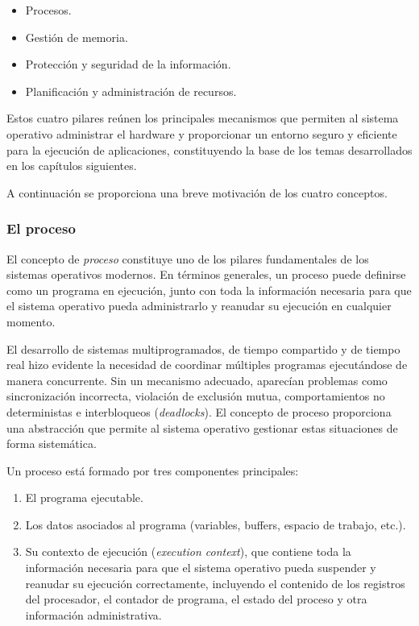 \begin{itemize}
  \item Procesos.
  \item Gestión de memoria.
  \item Protección y seguridad de la información.
  \item Planificación y administración de recursos.
\end{itemize}

Estos cuatro pilares reúnen los principales mecanismos que permiten al sistema operativo administrar el hardware y proporcionar un entorno seguro y eficiente para la ejecución de aplicaciones, constituyendo la base de los temas desarrollados en los capítulos siguientes.

A continuación se proporciona una breve motivación de los cuatro conceptos.

\subsubsection{El proceso}

El concepto de \textit{proceso} constituye uno de los pilares fundamentales de los sistemas operativos modernos. En términos generales, un proceso puede definirse como un programa en ejecución, junto con toda la información necesaria para que el sistema operativo pueda administrarlo y reanudar su ejecución en cualquier momento.

El desarrollo de sistemas multiprogramados, de tiempo compartido y de tiempo real hizo evidente la necesidad de coordinar múltiples programas ejecutándose de manera concurrente. Sin un mecanismo adecuado, aparecían problemas como sincronización incorrecta, violación de exclusión mutua, comportamientos no deterministas e interbloqueos (\emph{deadlocks}). El concepto de proceso proporciona una abstracción que permite al sistema operativo gestionar estas situaciones de forma sistemática.

Un proceso está formado por tres componentes principales:
\begin{enumerate}
  \item El programa ejecutable.
  \item Los datos asociados al programa (variables, buffers, espacio de trabajo, etc.).
  \item Su contexto de ejecución (\emph{execution context}), que contiene toda la información necesaria para que el sistema operativo pueda suspender y reanudar su ejecución correctamente, incluyendo el contenido de los registros del procesador, el contador de programa, el estado del proceso y otra información administrativa.
\end{enumerate}

